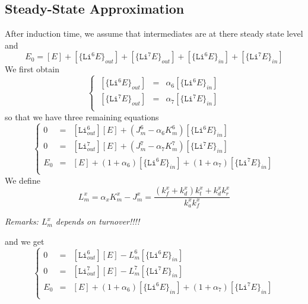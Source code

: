 \documentclass[aps,onecolumn]{revtex4}
\newcommand{\mychem}[1]{\mathtt{#1}}
\begin{document}
\subsection{Steady-State Approximation}
After induction time, we assume that intermediates are at there steady state level
and
\begin{equation}
	E_0 = [E] 
	+ [\lbrace\mychem{Li}^6E\rbrace_{out}]
	+ [\lbrace\mychem{Li}^7E\rbrace_{out}]
	+ [\lbrace\mychem{Li}^6E\rbrace_{in}]
	+ [\lbrace\mychem{Li}^7E\rbrace_{in}]
\end{equation}
We first obtain
\begin{equation}
	\left\lbrace
	\begin{array}{rcl}
	~[\lbrace\mychem{Li}^6E\rbrace_{out}] & = & \alpha_6 [\lbrace\mychem{Li}^6E\rbrace_{in}]\\%
	~[\lbrace\mychem{Li}^7E\rbrace_{out}] & = & \alpha_7 [\lbrace\mychem{Li}^7E\rbrace_{in}]\\
	\end{array}
	\right.
\end{equation}
so that we have three remaining equations
\begin{equation}
	\left\lbrace
	\begin{array}{rcl}
	0 & = & [\mathtt{Li}^6_{out}][E] + \left( J_m^6 - \alpha_6 K_m^6 \right) [\lbrace\mychem{Li}^6E\rbrace_{in}]\\
	0  & = & [\mathtt{Li}^7_{out}][E] + \left( J_m^7 - \alpha_7 K_m^7 \right) [\lbrace\mychem{Li}^7E\rbrace_{in}]\\
	E_0 & = & [E] + (1+\alpha_6) [\lbrace\mychem{Li}^6E\rbrace_{in}] + (1+\alpha_7) [\lbrace\mychem{Li}^7E\rbrace_{in}]\\
	\end{array}
	\right.
\end{equation}
We define
\begin{equation}
L_m^x = \alpha_x K_m^x - J_m^x = \dfrac{ (k_f^x+k_d^x) k_t^x + k_d^x k_r^x}{k_a^x k_f^x}
\end{equation}
\centerline{\it Remarks: $L_m^x$ depends on turnover!!!!}
and we get
\begin{equation}
\left\lbrace
	\begin{array}{rcl}
	0   & = & [\mathtt{Li}^6_{out}][E] - L_m^6 [\lbrace\mychem{Li}^6E\rbrace_{in}]\\
	0   & = & [\mathtt{Li}^7_{out}][E] - L_m^7 [\lbrace\mychem{Li}^7E\rbrace_{in}]\\
	E_0 & = & [E] + (1+\alpha_6) [\lbrace\mychem{Li}^6E\rbrace_{in}] + (1+\alpha_7) [\lbrace\mychem{Li}^7E\rbrace_{in}]\\
	\end{array}
	\right.
\end{equation}
\end{document}
